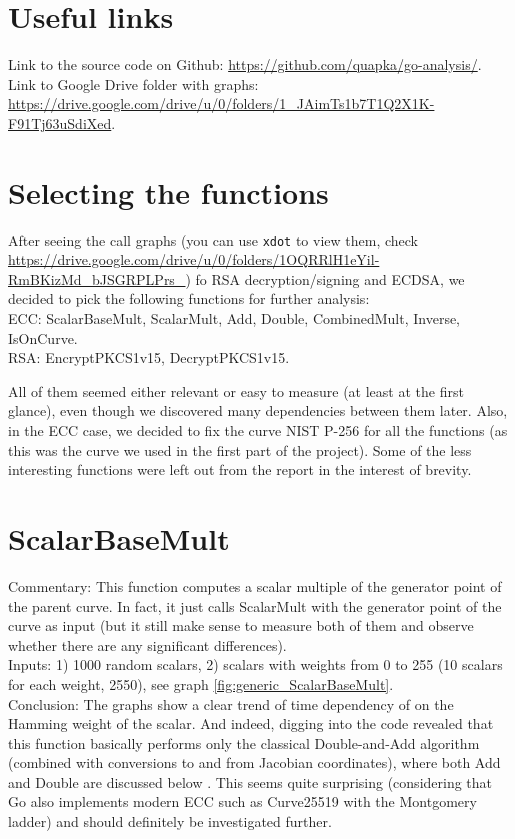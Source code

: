 \documentclass[a4paper]{scrartcl}
\subtitle{}
\begin{document}

\section{Useful links}
Link to the source code on Github: \url{https://github.com/quapka/go-analysis/}.\\
Link to Google Drive folder with graphs: \url{https://drive.google.com/drive/u/0/folders/1_JAimTs1b7T1Q2X1K-F91Tj63uSdiXed}.

\section{Selecting the functions}
After seeing the call graphs (you can use \verb+xdot+ to view them, check \url{https://drive.google.com/drive/u/0/folders/1OQRRlH1eYil-RmBKizMd_bJSGRPLPrs_}) fo RSA decryption/signing and ECDSA, we decided to pick the following functions for further analysis:
\\ECC: ScalarBaseMult, ScalarMult, Add, Double, CombinedMult, Inverse, IsOnCurve.
\\RSA: EncryptPKCS1v15, DecryptPKCS1v15.

All of them seemed either relevant or easy to measure (at least at the first glance), even though we discovered many dependencies between them later. Also, in the ECC case, we decided to fix the curve NIST P-256 for all the functions (as this was the curve we used in the first part of the project). Some of the less interesting functions were left out from the report in the interest of brevity.

\section{ScalarBaseMult}
Commentary: This function computes a scalar multiple of the generator point of the parent curve. In fact, it just calls ScalarMult with the generator point of the curve as input (but it still make sense to measure both of them and observe whether there are any significant differences).
\\Inputs: 1) 1000 random scalars, 2) scalars with weights from 0 to 255 (10 scalars for each weight, 2550), see graph \ref{fig:generic_ScalarBaseMult}.
\\Conclusion: The graphs show a clear trend of time dependency of on the Hamming weight of the scalar. And indeed, digging into the code revealed that this function basically performs only the classical Double-and-Add algorithm (combined with conversions to and from Jacobian coordinates), where both Add and Double are discussed below . This seems quite surprising (considering that Go also implements modern ECC such as Curve25519 with the Montgomery ladder) and should definitely be investigated further.
\end{document}
